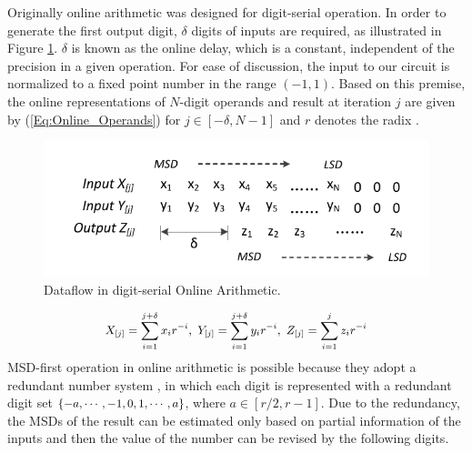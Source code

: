 \documentclass{acm_proc_article-sp}
\begin{document}
Originally online arithmetic was designed for digit-serial operation. In order to generate the first output digit, $\delta$ digits of inputs are required, as illustrated in Figure \ref{Fig:OnlineDataFlow}. $\delta$ is known as the online delay, which is a constant, independent of the precision in a given operation. For ease of discussion, the input to our circuit is normalized to a fixed point number in the range $(-1,1)$. Based on this premise, the online representations of $N$-digit operands and result at iteration $j$ are given by (\ref{Eq:Online_Operands}) for $j\in[-\delta,N-1]$ and $r$ denotes the radix \cite{Ercegovac_Book}.
\vspace{-1ex}
%
\begin{figure}[htbp]
  \centering
  \vspace{-2.5ex}
  \includegraphics[width=.44\textwidth]{./Figures/OnlineArithmetic_DataFlow.pdf}
  \vspace{-3ex}
  \caption{Dataflow in digit-serial Online Arithmetic.}
  \label{Fig:OnlineDataFlow}
\end{figure}
%
\begin{eqnarray}\label{Eq:Online_Operands}
\footnotesize
  X_{[j]}=\sum_{i=1}^{j+\delta}x_ir^{-i},~Y_{[j]}=\sum_{i=1}^{j+\delta}y_ir^{-i},~Z_{[j]}=\sum_{i=1}^{j}z_ir^{-i}
\normalsize
\end{eqnarray}
%
MSD-first operation in online arithmetic is possible because they adopt a redundant number system \cite{RedundantNumber}, in which each digit is represented with a redundant digit set $\{-a, \cdots,-1,\\0, 1, \cdots, a\}$, where $a\in[r/2,r-1]$. Due to the redundancy, the MSDs of the result can be estimated only based on partial information of the inputs and then the value of the number can be revised by the following digits.
\end{document}
